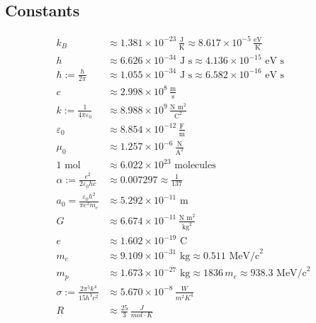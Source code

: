 \documentclass[12pt]{article}
\begin{document}
\subsection{Constants}
\begin{align*}
    k_B &\approx 1.381 \times 10^{-23} \, \frac{\text{J}}{\text{K}} \approx 8.617 \times 10^{-5} \, \frac{\text{eV}}{\text{K}} \\
    h &\approx 6.626 \times 10^{-34} \text{ J s} \approx 4.136 \times 10^{-15} \text{ eV s} \\
\hbar := \frac{h}{2 \pi} &\approx 1.055 \times 10^{-34} \text{ J s} \approx 6.582 \times 10^{-16} \text{ eV s} \\
    c &\approx 2.998 \times 10^8 \, \frac{\text{m}}{\text{s}} \\
    k := \frac{1}{4 \pi \varepsilon_0} &\approx 8.988 \times 10^9 \, \frac{\text{N m}^2}{\text{C}^2} \\
    \varepsilon_0 &\approx 8.854 \times 10^{-12} \, \frac{\text{F}}{\text{m}} \\
    \mu_0 &\approx 1.257 \times 10^{-6} \, \frac{\text{N}}{\text{A}^2} \\
    1 \text{ mol} &\approx 6.022 \times 10^{23} \text{ molecules} \\
    \alpha := \frac{e^2}{2 \varepsilon_0 h c} &\approx 0.007297 \approx \frac{1}{137} \\
    a_0 = \frac{\varepsilon_0 h^2}{\pi e^2 m_e} &\approx 5.292 \times 10^{-11} \text{ m} \\
    G &\approx 6.674 \times 10^{-11} \, \frac{\text{N m}^2}{\text{kg}^2} \\
    e &\approx 1.602 \times 10^{-19} \text{ C} \\
    m_e &\approx 9.109 \times 10^{-31} \text{ kg} \approx 0.511 \text{ MeV/c}^2 \\
    m_p &\approx 1.673 \times 10^{-27} \text{ kg} \approx 1836 \, m_e \approx 938.3 \text{ MeV/c}^2 \\
    \sigma := \frac{2 \pi^5 k^4}{15 h^3 c^2} &\approx 5.670 \times 10^{-8} \, \frac{W}{m^2K^4} \\
    R &\approx \frac{25}{3} \, \frac{J}{mol \cdot K} \\
\end{align*}
\end{document}
